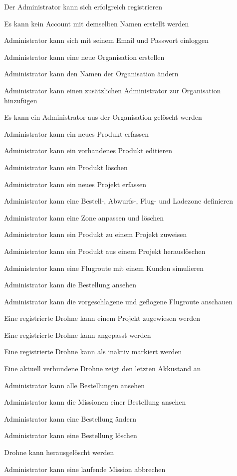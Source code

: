 \begin{todolist}
	\item[\done] Der Administrator kann sich erfolgreich registrieren
	\item Es kann kein Account mit demselben Namen erstellt werden
	\item[\done] Administrator kann sich mit seinem Email und Passwort einloggen
	\item[\done] Administrator kann eine neue Organisation erstellen
	\item[\done] Administrator kann den Namen der Organisation ändern
	\item Administrator kann einen zusätzlichen Administrator zur Organisation hinzufügen
	\item Es kann ein Administrator aus der Organisation gelöscht werden
	\item[\done] Administrator kann ein neues Produkt erfassen
	\item[\done] Administrator kann ein vorhandenes Produkt editieren
	\item[\done] Administrator kann ein Produkt löschen
	\item[\done] Administrator kann ein neues Projekt erfassen
	\item Administrator kann eine Bestell-, Abwurfs-, Flug- und Ladezone definieren
	\item Administrator kann eine Zone anpassen und löschen
	\item Administrator kann ein Produkt zu einem Projekt zuweisen
	\item Administrator kann ein Produkt aus einem Projekt herauslöschen
	\item Administrator kann eine Flugroute mit einem Kunden simulieren
	
	\item Administrator kann die Bestellung ansehen
	\item Administrator kann die vorgeschlagene und geflogene Flugroute anschauen
	
	\item[\done] Eine registrierte Drohne kann einem Projekt zugewiesen werden
	\item Eine registrierte Drohne kann angepasst werden
	\item Eine registrierte Drohne kann als inaktiv markiert werden
	\item Eine aktuell verbundene Drohne zeigt den letzten Akkustand an
	\item Administrator kann alle Bestellungen ansehen
	\item Administrator kann die Missionen einer Bestellung ansehen
	
	\item Administrator kann eine Bestellung ändern 
	\item Administrator kann eine Bestellung löschen 
	\item Drohne kann herausgelöscht werden 
	
	\item Administrator kann eine laufende Mission abbrechen 
\end{todolist}

